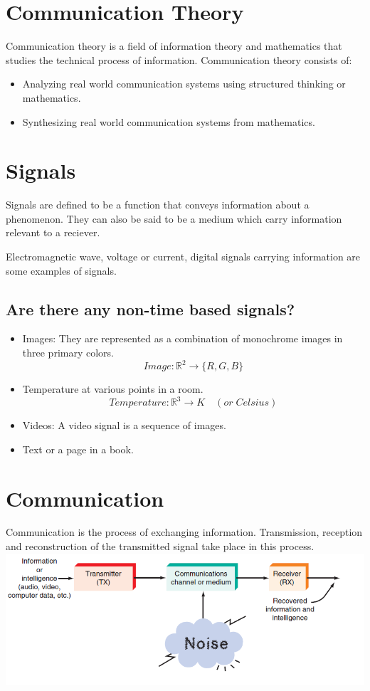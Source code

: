 \documentclass{article}
\begin{document}
\section{Communication Theory}

Communication theory is a field of information theory and mathematics that studies the technical process of information.
Communication theory consists of:
\begin{itemize}
    \item Analyzing real world communication systems using structured thinking or mathematics.
    \item Synthesizing real world communication systems from mathematics.
\end{itemize}

\section{Signals}
Signals are defined to be a function that conveys information about a phenomenon.
They can also be said to be a medium which carry information relevant to a reciever.

Electromagnetic wave, voltage or current, digital signals carrying information are some examples of signals.

\subsection{Are there any non-time based signals?}
\begin{itemize}
    \item Images: They are represented as a combination of  monochrome images in three primary colors.
    $$ Image: \mathbb{R}^2 \rightarrow \{ R, G, B\}$$
    \item Temperature at various points in a room.
    $$ Temperature:\mathbb{R}^3 \rightarrow K \quad(or\; Celsius)$$
    \item Videos:  A video signal is a sequence of images.
    \item Text or a page in a book.
\end{itemize}

\section{Communication}
Communication is the process of exchanging information. Transmission, reception and reconstruction of the transmitted signal take place in this process.
\includegraphics[width=\textwidth]{ptp.png}
\end{document}
